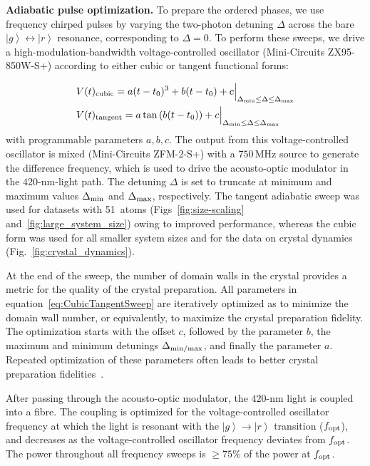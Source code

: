 \documentclass[prl,nobalancelastpage,twocolumn,superscriptaddress,nofootinbib]{revtex4}
\newcommand{\ket}[1]{\left|#1\right\rangle}
\begin{document}
\begin{footnotesize}
\noindent
\textbf{Adiabatic pulse optimization.}
To prepare the ordered phases, we use frequency chirped pulses by
varying the two-photon detuning $\Delta$ across the bare $\ket{g}
\leftrightarrow \ket{r}$ resonance, corresponding to $\Delta=0$. To perform
these sweeps, we drive a high-modulation-bandwidth voltage-controlled
oscillator (Mini-Circuits ZX95-850W-S+) according to either cubic or
tangent functional forms:

\begin{equation}
\begin{aligned}
    \label{eq:CubicTangentSweep}
    &V(t)_{\rm cubic} = a(t-t_0)^3 + b(t-t_0) + c\Big|_{\Delta_{\rm min}\leq\Delta\leq\Delta_{\rm max}}
\\
&V(t)_{\rm tangent} = a \tan\left( b(t-t_0) \right) + c\Big|_{\Delta_{\rm min}\leq\Delta\leq\Delta_{\rm max}}
\end{aligned}
\end{equation}
with programmable parameters $a, b, c$. The output from this voltage-controlled
oscillator is mixed (Mini-Circuits ZFM-2-S+) with a $750\,$MHz source to
generate the difference frequency, which is used to drive the acousto-optic modulator in the
$420$-nm-light path. The detuning $\Delta$ is set to truncate at minimum and
maximum values $\Delta_{\rm min}$ and $\Delta_{\rm max}$, respectively. The
tangent adiabatic sweep was used for datasets with 51~atoms (Figs~\ref{fig:size-scaling} and~\ref{fig:large_system_size})
owing to improved performance, whereas the cubic
form was used for all smaller system sizes and for the data on crystal
dynamics (Fig.~\ref{fig:crystal_dynamics}).

At the end of the sweep, the number of domain walls in the crystal provides a
metric for the quality of the crystal preparation. All parameters in
equation~\eqref{eq:CubicTangentSweep} are iteratively optimized as to minimize
the domain wall number, or equivalently, to maximize the crystal preparation
fidelity. The optimization starts with the offset $c$, followed by the
parameter $b$, the maximum and minimum detunings $\Delta_{\rm min/max}$,
and finally the parameter $a$. Repeated optimization of these parameters often
leads to better crystal preparation fidelities~\cite{Johansson2012}.

After passing through the acousto-optic modulator, the $420$-nm light is
coupled into a fibre. The coupling is optimized for the voltage-controlled
oscillator frequency at which the light is resonant with the $\ket{g} \to
\ket{r}$ transition ($f_{\rm opt}$), and decreases as the voltage-controlled
oscillator frequency deviates from $f_{\rm opt}$. The power throughout all
frequency sweeps is $\geq 75$\% of the power at $f_{\rm opt}$.


\end{footnotesize}
\end{document}
